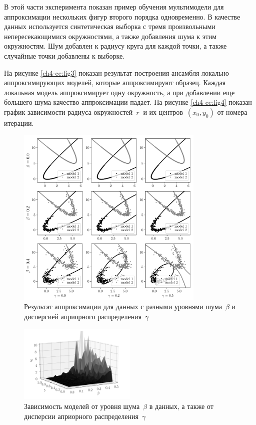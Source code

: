 В этой части эксперимента показан пример обучения мультимодели для аппроксимации нескольких фигур второго порядка одновременно. В качестве данных используется синтетическая выборка с тремя произвольными непересекающимися окружностями, а также добавления шума к этим окружностям. Шум добавлен к радиусу круга для каждой точки, а также случайные точки добавлены к выборке.

На рисунке \ref{ch4-ce:fig3} показан результат построения ансамбля локально аппроксимирующих моделей, которые аппроксимируют образец. Каждая локальная модель аппроксимирует одну окружность, а при добавлении еще большего шума качество аппроксимации падает.
На рисунке \ref{ch4-ce:fig4} показан график зависимости радиуса окружностей~$ r~$ и их центров~$(x_0, y_0)$ от номера итерации.

\begin{figure}[!ht]
\center
\includegraphics[width=0.8\textwidth]{results/priorexpertfig/beta_gamma}
\caption{Результат аппроксимации для данных с разными уровнями шума~$\beta$ и дисперсией априорного распределения~$\gamma$}
\label{ch4-ce:fig4-1}
\end{figure}

\begin{figure}[!ht]
\center
\includegraphics[width=0.5\textwidth]{results/priorexpertfig/3dplot}
\caption{Зависимость моделей от уровня шума~$\beta$ в данных, а также от дисперсии априорного распределения~$\gamma$}
\label{ch4-ce:fig5}
\end{figure}

